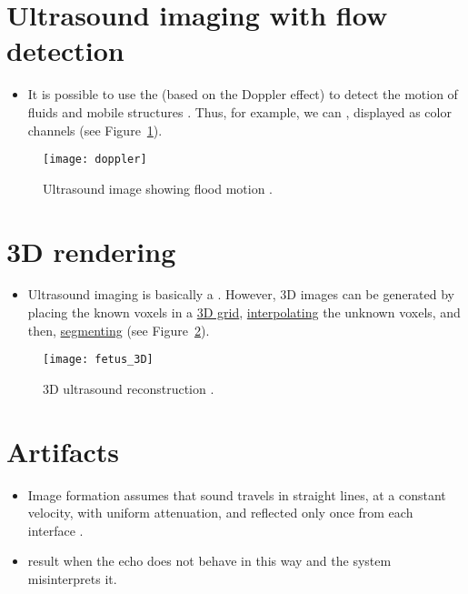 \section{Ultrasound imaging with flow detection}
\begin{itemize}
\item It is possible to use the  (based
  on the Doppler effect) to detect the motion of fluids and mobile
  structures
  \cite{bushberg2011essential,abdulla2025ultrasound_machine}. Thus,
  for example, we can , displayed as color channels \cite{bushberg2011essential}
  (see Figure~\ref{fig:doppler}).
\end{itemize}
\vspace{-4ex}
\begin{figure}[!h]
  \centering
  \texttt{[image: doppler]}
  \caption{Ultrasound image showing flood motion
    \cite{abdulla2025ultrasound_imaging_doppler}.\label{fig:doppler}}
\end{figure}

\section{3D rendering}
\begin{itemize}
\item Ultrasound imaging is basically a . However, 3D images can be generated by
  placing the known voxels in a
  \href{https://stackoverflow.com/questions/51907238/how-to-draw-a-2d-3d-grid-from-buffergeometry-in-three-js}{3D
    grid},
  \href{https://en.wikipedia.org/wiki/Trilinear_interpolation}{interpolating}
  the unknown voxels, and then,
  \href{https://en.wikipedia.org/wiki/Image_segmentation}{segmenting}
  (see Figure~\ref{fig:fetus_3D}).
\end{itemize}
\vspace{-4ex}
\begin{figure}[!h]
  \centering
  \texttt{[image: fetus\_3D]}
  \caption{3D ultrasound reconstruction
    \cite{fetal_diagnostic_centers}.\label{fig:fetus_3D}}
\end{figure}

\section{Artifacts}
\begin{itemize}
\item Image formation assumes that sound travels in straight lines, at
  a constant velocity, with uniform attenuation, and reflected only
  once from each interface \cite{abdulla2025ultrasound_artefacts}.
\item {}
  result when the echo does not behave in this way and the system
  misinterprets it.
\end{itemize}

